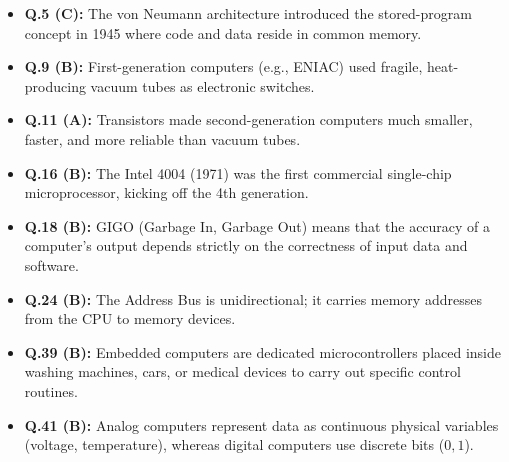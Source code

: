 \begin{expbox}
\begin{itemize}[leftmargin=5mm]
    \item \textbf{Q.5 (C):} The von Neumann architecture introduced the stored-program concept in 1945 where code and data reside in common memory.
    \item \textbf{Q.9 (B):} First-generation computers (e.g., ENIAC) used fragile, heat-producing vacuum tubes as electronic switches.
    \item \textbf{Q.11 (A):} Transistors made second-generation computers much smaller, faster, and more reliable than vacuum tubes.
    \item \textbf{Q.16 (B):} The Intel 4004 (1971) was the first commercial single-chip microprocessor, kicking off the 4th generation.
    \item \textbf{Q.18 (B):} GIGO (Garbage In, Garbage Out) means that the accuracy of a computer's output depends strictly on the correctness of input data and software.
    \item \textbf{Q.24 (B):} The Address Bus is unidirectional; it carries memory addresses from the CPU to memory devices.
    \item \textbf{Q.39 (B):} Embedded computers are dedicated microcontrollers placed inside washing machines, cars, or medical devices to carry out specific control routines.
    \item \textbf{Q.41 (B):} Analog computers represent data as continuous physical variables (voltage, temperature), whereas digital computers use discrete bits ($0, 1$).
\end{itemize}
\end{expbox}

\newpage
